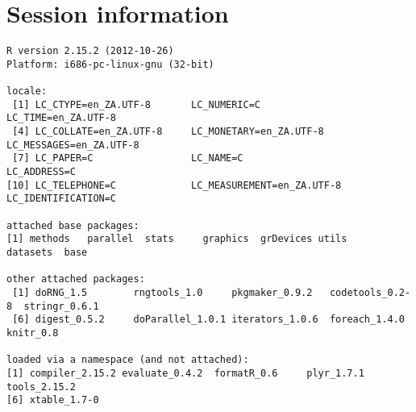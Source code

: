 \documentclass[a4paper,12pt]{article}\usepackage{graphicx, color}
\makeatletter
\newenvironment{kframe}{%
 \def\at@end@of@kframe{}%
 \ifinner\ifhmode%
  \def\at@end@of@kframe{\end{minipage}}%
  \begin{minipage}{\columnwidth}%
 \fi\fi%
 \def\FrameCommand##1{\hskip\@totalleftmargin \hskip-\fboxsep
 \colorbox{shadecolor}{##1}\hskip-\fboxsep
     \hskip-\linewidth \hskip-\@totalleftmargin \hskip\columnwidth}%
 \MakeFramed {\advance\hsize-\width
   \@totalleftmargin\z@ \linewidth\hsize
   \@setminipage}}%
 {\par\unskip\endMakeFramed%
 \at@end@of@kframe}
\newenvironment{knitrout}{}{} %
\renewenvironment{knitrout}{\begin{footnotesize}}{\end{footnotesize}}
\makeatother
\begin{document}
\section*{Session information}
\begin{knitrout}
\color{fgcolor}\begin{kframe}
\begin{verbatim}
R version 2.15.2 (2012-10-26)
Platform: i686-pc-linux-gnu (32-bit)

locale:
 [1] LC_CTYPE=en_ZA.UTF-8       LC_NUMERIC=C               LC_TIME=en_ZA.UTF-8       
 [4] LC_COLLATE=en_ZA.UTF-8     LC_MONETARY=en_ZA.UTF-8    LC_MESSAGES=en_ZA.UTF-8   
 [7] LC_PAPER=C                 LC_NAME=C                  LC_ADDRESS=C              
[10] LC_TELEPHONE=C             LC_MEASUREMENT=en_ZA.UTF-8 LC_IDENTIFICATION=C       

attached base packages:
[1] methods   parallel  stats     graphics  grDevices utils     datasets  base     

other attached packages:
 [1] doRNG_1.5        rngtools_1.0     pkgmaker_0.9.2   codetools_0.2-8  stringr_0.6.1   
 [6] digest_0.5.2     doParallel_1.0.1 iterators_1.0.6  foreach_1.4.0    knitr_0.8       

loaded via a namespace (and not attached):
[1] compiler_2.15.2 evaluate_0.4.2  formatR_0.6     plyr_1.7.1      tools_2.15.2   
[6] xtable_1.7-0   
\end{verbatim}
\end{kframe}
\end{knitrout}


\printbibliography[heading=bibintoc]
\end{document}
